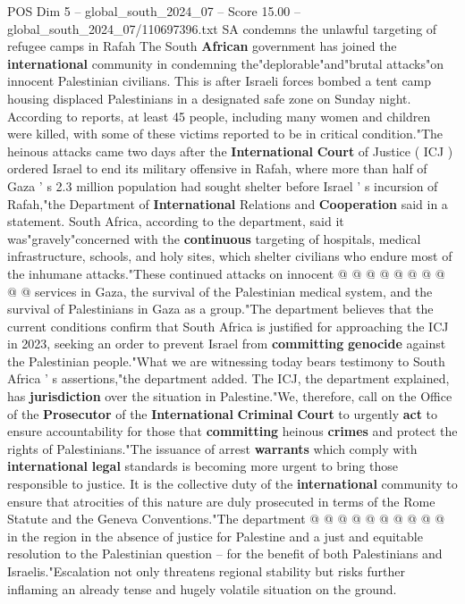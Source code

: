 \begin{textsample}{POS Dim 5 – global\_south\_2024\_07 – Score 15.00 – global\_south\_2024\_07/110697396.txt}  \label{ex:f5_pos_178}
SA condemns the unlawful targeting of refugee camps in Rafah The South \textbf{African} government has joined the \textbf{international} community in condemning the"deplorable"and"brutal attacks"on innocent Palestinian civilians.
This is after Israeli forces bombed a tent camp housing displaced Palestinians in a designated safe zone on Sunday night.
According to reports, at least 45 people, including many women and children were killed, with some of these victims reported to be in critical condition."The heinous attacks came two days after the \textbf{International} \textbf{Court} of Justice ( ICJ ) ordered Israel to end its military offensive in Rafah, where more than half of Gaza ' s 2.3 million population had sought shelter before Israel ' s incursion of Rafah,"the Department of \textbf{International} Relations and \textbf{Cooperation} said in a statement.
South Africa, according to the department, said it was"gravely"concerned with the \textbf{continuous} targeting of hospitals, medical infrastructure, schools, and holy sites, which shelter civilians who endure most of the inhumane attacks."These continued attacks on innocent @ @ @ @ @ @ @ @ @ @ services in Gaza, the survival of the Palestinian medical system, and the survival of Palestinians in Gaza as a group."The department believes that the current conditions confirm that South Africa is justified for approaching the ICJ in 2023, seeking an order to prevent Israel from \textbf{committing} \textbf{genocide} against the Palestinian people."What we are witnessing today bears testimony to South Africa ' s assertions,"the department added.
The ICJ, the department explained, has \textbf{jurisdiction} over the situation in Palestine."We, therefore, call on the Office of the \textbf{Prosecutor} of the \textbf{International} \textbf{Criminal} \textbf{Court} to urgently \textbf{act} to ensure accountability for those that \textbf{committing} heinous \textbf{crimes} and protect the rights of Palestinians."The issuance of arrest \textbf{warrants} which comply with \textbf{international} \textbf{legal} standards is becoming more urgent to bring those responsible to justice.
It is the collective duty of the \textbf{international} community to ensure that atrocities of this nature are duly prosecuted in terms of the Rome Statute and the Geneva Conventions."The department @ @ @ @ @ @ @ @ @ @ in the region in the absence of justice for Palestine and a just and equitable resolution to the Palestinian question -- for the benefit of both Palestinians and Israelis."Escalation not only threatens regional stability but risks further inflaming an already tense and hugely volatile situation on the ground.

\end{textsample}
